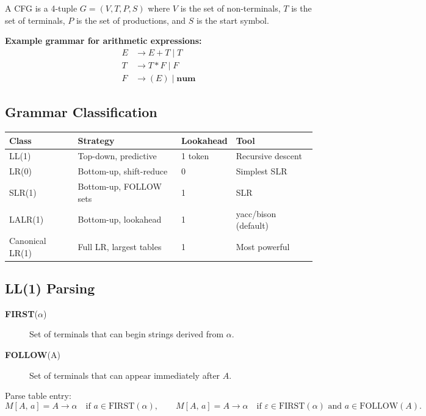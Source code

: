 \documentclass[12pt,a4paper]{article}
\begin{document}
A CFG is a 4-tuple $G = (V, T, P, S)$ where $V$ is the set of non-terminals,
$T$ is the set of terminals, $P$ is the set of productions, and $S$ is the start symbol.

\textbf{Example grammar for arithmetic expressions:}
\begin{align*}
E &\to E + T \mid T \\
T &\to T * F \mid F \\
F &\to (E) \mid \mathbf{num}
\end{align*}

\subsection{Grammar Classification}

\begin{center}
\begin{tabular}{llll}
\toprule
Class & Strategy & Lookahead & Tool\\
\midrule
LL(1)           & Top-down, predictive & 1 token & Recursive descent\\
LR(0)           & Bottom-up, shift-reduce & 0 & Simplest SLR\\
SLR(1)          & Bottom-up, FOLLOW sets  & 1 & SLR\\
LALR(1)         & Bottom-up, lookahead    & 1 & yacc/bison (default)\\
Canonical LR(1) & Full LR, largest tables & 1 & Most powerful\\
\bottomrule
\end{tabular}
\end{center}

\subsection{LL(1) Parsing}

\begin{description}
  \item[\textbf{FIRST}($\alpha$)] Set of terminals that can begin strings derived from $\alpha$.
  \item[\textbf{FOLLOW}(A)] Set of terminals that can appear immediately after $A$.
\end{description}

Parse table entry:
\[
M[A,\,a] = A \to \alpha \quad \text{if } a \in \text{FIRST}(\alpha),
\qquad
M[A,\,a] = A \to \alpha \quad \text{if } \varepsilon \in \text{FIRST}(\alpha) \text{ and } a \in \text{FOLLOW}(A).
\]
\end{document}

